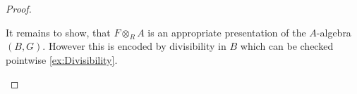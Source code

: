 \begin{proof}
\begin{itemize}
	

	It remains to show, that $F \otimes_R A$ is an appropriate presentation of the $A$-algebra $(B,G)$. However this is encoded by divisibility in $B$ which can be checked pointwise \ref{ex:Divisibility}. %
		\end{itemize}
	
\end{proof}



